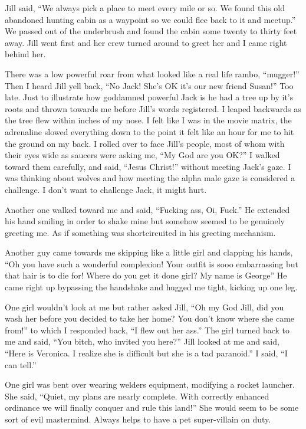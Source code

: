 Jill said, ``We always pick a place to meet every mile or so. We found this old abandoned hunting cabin as a waypoint so we could flee back to it and meetup.'' We passed out of the underbrush and found the cabin some twenty to thirty feet away. Jill went first and her crew turned around to greet her and I came right behind her.

There was a low powerful roar from what looked like a real life rambo, ``mugger!'' Then I heard Jill yell back, ``No Jack! She's OK it's our new friend Susan!'' Too late. Just to illustrate how goddamned powerful Jack is he had a tree up by it's roots and thrown towards me before Jill's words registered. I leaped backwards as the tree flew within inches of my nose. I felt like I was in the movie matrix, the adrenaline slowed everything down to the point it felt like an hour for me to hit the ground on my back. I rolled over to face Jill's people, most of whom with their eyes wide as saucers were asking me, ``My God are you OK?'' I walked toward them carefully, and said, ``Jesus Christ!'' without meeting Jack's gaze. I was thinking about wolves and how meeting the alpha male gaze is considered a challenge. I don't want to challenge Jack, it might hurt.

Another one walked toward me and said, ``Fucking ass, Oi, Fuck.'' He extended his hand smiling in order to shake mine but somehow seemed to be genuinely greeting me. As if something was shortcircuited in his greeting mechanism.

Another guy came towards me skipping like a little girl and clapping his hands, ``Oh you have such a wonderful complexion! Your outfit is sooo embarrassing but that hair is to die for! Where do you get it done girl? My name is George'' He came right up bypassing the handshake and hugged me tight, kicking up one leg.

One girl wouldn't look at me but rather asked Jill, ``Oh my God Jill, did you wash her before you decided to take her home? You don't know where she came from!'' to which I responded back, ``I flew out her ass.'' The girl turned back to me and said, ``You bitch, who invited you here?'' Jill looked at me and said, ``Here is Veronica. I realize she is difficult but she is a tad paranoid.'' I said, ``I can tell.''

One girl was bent over wearing welders equipment, modifying a rocket launcher. She said, ``Quiet, my plans are nearly complete. With correctly enhanced ordinance we will finally conquer and rule this land!'' She would seem to be some sort of evil mastermind. Always helps to have a pet super-villain on duty. 

